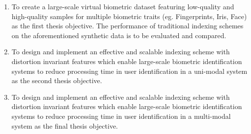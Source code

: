 \begin{enumerate}

    \item To create a large-scale virtual biometric dataset featuring low-quality and high-quality samples for multiple biometric traits (eg. Fingerprints, Iris, Face) as the first thesis objective. 
    The performance of traditional indexing schemes on the aforementioned synthetic data is to be evaluated and compared. 
    \item To design and implement an effective and scalable indexing scheme with distortion invariant features which enable large-scale biometric identification systems to reduce processing time in user identification in a uni-modal system as the second thesis objective.
    \item To design and implement an effective and scalable indexing scheme with distortion invariant features which enable large-scale biometric identification systems to reduce processing time in user identification in a multi-modal system as the final thesis objective.
    


\end{enumerate}